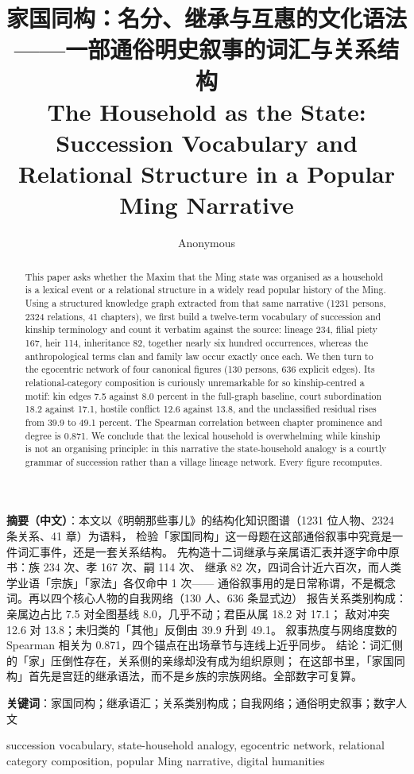 \documentclass[conference]{IEEEtran}
\title{家国同构：名分、继承与互惠的文化语法——一部通俗明史叙事的词汇与关系结构\\[2pt]
\large The Household as the State: Succession Vocabulary and Relational Structure in a Popular Ming Narrative}
\author{Anonymous}
\date{}
\begin{document}
\maketitle

\noindent\textbf{摘要（中文）}：本文以《明朝那些事儿》的结构化知识图谱（1231 位人物、2324 条关系、41 章）为语料，
检验「家国同构」这一母题在这部通俗叙事中究竟是一件词汇事件，还是一套关系结构。
先构造十二词继承与亲属语汇表并逐字命中原书：族 234 次、孝 167 次、嗣 114 次、
继承 82 次，四词合计近六百次，而人类学业语「宗族」「家法」各仅命中 1 次——
通俗叙事用的是日常称谓，不是概念词。再以四个核心人物的自我网络（130 人、636 条显式边）
报告关系类别构成：亲属边占比 7.5 对全图基线 8.0，几乎不动；君臣从属 18.2 对 17.1；
敌对冲突 12.6 对 13.8；未归类的「其他」反倒由 39.9 升到 49.1。
叙事热度与网络度数的 Spearman 相关为 0.871，四个锚点在出场章节与连线上近乎同步。
结论：词汇侧的「家」压倒性存在，关系侧的亲缘却没有成为组织原则；
在这部书里，「家国同构」首先是宫廷的继承语法，而不是乡族的宗族网络。全部数字可复算。

\noindent\textbf{关键词}：家国同构；继承语汇；关系类别构成；自我网络；通俗明史叙事；数字人文

\vspace{6pt}
\begin{abstract}
This paper asks whether the Maxim that the Ming state was organised as a
household is a lexical event or a relational structure in a widely read popular history of the
Ming. Using a structured knowledge graph extracted from that same narrative (1231 persons, 2324
relations, 41 chapters), we first build a twelve-term vocabulary of succession and kinship
terminology and count it verbatim against the source: lineage 234, filial piety 167, heir 114,
inheritance 82, together nearly six hundred occurrences, whereas the anthropological terms clan
and family law occur exactly once each. We then turn to the egocentric network of four canonical
figures (130 persons, 636 explicit edges). Its relational-category composition is curiously
unremarkable for so kinship-centred a motif: kin edges 7.5 against 8.0 percent in the full-graph
baseline, court subordination 18.2 against 17.1, hostile conflict 12.6 against 13.8, and the
unclassified residual rises from 39.9 to 49.1 percent. The Spearman correlation between chapter
prominence and degree is 0.871. We conclude that the lexical household is overwhelming while
kinship is not an organising principle: in this narrative the state-household analogy is a
courtly grammar of succession rather than a village lineage network. Every figure recomputes.
\end{abstract}

\begin{IEEEkeywords}
succession vocabulary, state-household analogy, egocentric network, relational category composition, popular Ming narrative, digital humanities
\end{IEEEkeywords}











\end{document}
